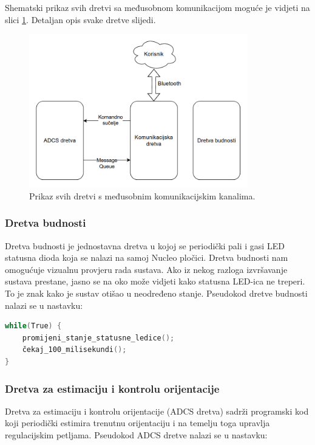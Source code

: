 \documentclass[times, utf8, diplomski, numeric]{templates/template}
\begin{document}
{{{            Shematski prikaz svih dretvi sa međusobnom komunikacijom moguće je vidjeti na slici \ref{fig:dijagram_dretvi}. Detaljan opis svake dretve slijedi.

            \begin{figure}[htb]
            \centering
            \includegraphics[width=0.85\textwidth]{other/dijagram_dretvi.png}
            \caption{Prikaz svih dretvi s međusobnim komunikacijskim kanalima.}
            \label{fig:dijagram_dretvi}
            \end{figure}

            \subsubsection{Dretva budnosti}{
                Dretva budnosti je jednostavna dretva u kojoj se periodički pali i gasi LED statusna dioda koja se nalazi na samoj Nucleo pločici. Dretva budnosti nam omogućuje vizualnu provjeru rada sustava. Ako iz nekog razloga izvršavanje sustava prestane, jasno se na oko može vidjeti kako statusna LED-ica ne treperi. To je znak kako je sustav otišao u neodređeno stanje. Pseudokod dretve budnosti nalazi se u nastavku:

                \begin{lstlisting}[language=C]
while(True) {
    promijeni_stanje_statusne_ledice();
    čekaj_100_milisekundi();
}               \end{lstlisting}
            }
    
            \subsubsection{Dretva za estimaciju i kontrolu orijentacije}{
                Dretva za estimaciju i kontrolu orijentacije (ADCS dretva) sadrži programski kod koji periodički estimira trenutnu orijentaciju i na temelju toga upravlja regulacijskim petljama. Pseudokod ADCS dretve nalazi se u nastavku:
        
}}}}
\end{document}
